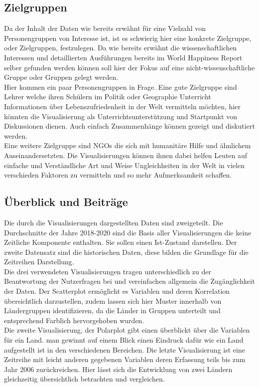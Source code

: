 \subsection{Zielgruppen}

Da der Inhalt der Daten wie bereits erwähnt für eine Vielzahl von Personengruppen von Interesse ist, ist es schwierig hier eine konkrete Zielgruppe, oder Zielgruppen, festzulegen. Da wie bereits erwähnt die wissenschaftlichen Interessen und detaillierten Ausführungen bereits im World Happiness Report selber gefunden werden können soll hier der Fokus auf eine nicht-wissenschaftliche Gruppe oder Gruppen gelegt werden. \\

Hier kommen ein paar Personengruppen in Frage. Eine gute Zielgruppe sind Lehrer welche ihren Schülern im Politik oder Geographie Unterricht Informationen über Lebenszufriedenheit in der Welt vermitteln möchten, hier könnten die Visualisierung als Unterrichtsunterstützung und Startpunkt von Diskussionen dienen. Auch einfach Zusammenhänge können gezeigt und diskutiert werden. \\

Eine weitere Zielgruppe sind NGOs die sich mit humanitäre Hilfe und ähnlichem Auseinandersetzten. Die Visualisierungen können ihnen dabei helfen Leuten auf einfache und Verständliche Art und Weise Ungleichheiten in der Welt in vielen verschieden Faktoren zu vermitteln und so mehr Aufmerksamkeit schaffen. 

\subsection{Überblick und Beiträge}
Die durch die Visualisierungen dargestellten Daten sind zweigeteilt. Die Durchschnitte der Jahre 2018-2020 sind die Basis aller Visualisierungen die keine Zeitliche Komponente enthalten. Sie sollen einen Ist-Zustand darstellen. Der zweite Datensatz sind die historischen Daten, diese bilden die Grundlage für die Zeitreihen Darstellung. \\

Die drei verwendeten Visualisierungen tragen unterschiedlich zu der Beantwortung der Nutzerfragen bei und vereinfachen allgemein die Zugänglichkeit der Daten. Der Scatterplot ermöglicht es Variablen und deren Korrelation übersichtlich darzustellen, zudem lassen sich hier Muster innerhalb von Ländergruppen identifizieren, da die Länder in Gruppen unterteilt und entsprechend Farblich hervorgehoben wurden. \\

Die zweite Visualisierung, der Polarplot gibt einen überblickt über die Variablen für ein Land. man gewinnt auf einem Blick einen Eindruck dafür wie ein Land aufgestellt ist in den verschiedenen Bereichen. Die letzte Visualisierung ist eine Zeitreihe mit leicht anderen gegebenen Variablen deren Erfassung teils bis zum Jahr 2006 zurückreichen. Hier lässt sich die Entwicklung von zwei Ländern gleichzeitig übersichtlich betrachten und vergleichen. \\